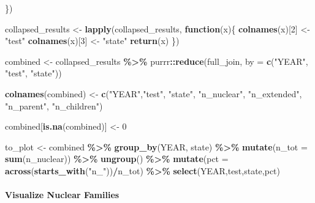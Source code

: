 \documentclass[
]{book}
\newenvironment{Shaded}{\begin{snugshade}}{\end{snugshade}}
\newcommand{\AttributeTok}[1]{\textcolor[rgb]{0.13,0.29,0.53}{#1}}
\newcommand{\ControlFlowTok}[1]{\textcolor[rgb]{0.13,0.29,0.53}{\textbf{#1}}}
\newcommand{\DecValTok}[1]{\textcolor[rgb]{0.00,0.00,0.81}{#1}}
\newcommand{\FunctionTok}[1]{\textcolor[rgb]{0.13,0.29,0.53}{\textbf{#1}}}
\newcommand{\NormalTok}[1]{#1}
\newcommand{\OtherTok}[1]{\textcolor[rgb]{0.56,0.35,0.01}{#1}}
\newcommand{\SpecialCharTok}[1]{\textcolor[rgb]{0.81,0.36,0.00}{\textbf{#1}}}
\newcommand{\StringTok}[1]{\textcolor[rgb]{0.31,0.60,0.02}{#1}}
\begin{document}
\begin{Shaded}
\begin{Highlighting}[]
\NormalTok{\})}


\NormalTok{collapsed\_results }\OtherTok{\textless{}{-}} \FunctionTok{lapply}\NormalTok{(collapsed\_results, }\ControlFlowTok{function}\NormalTok{(x)\{}
  \FunctionTok{colnames}\NormalTok{(x)[}\DecValTok{2}\NormalTok{] }\OtherTok{\textless{}{-}} \StringTok{"test"}
  \FunctionTok{colnames}\NormalTok{(x)[}\DecValTok{3}\NormalTok{] }\OtherTok{\textless{}{-}} \StringTok{"state"}
  \FunctionTok{return}\NormalTok{(x)}
\NormalTok{\})}

\NormalTok{combined }\OtherTok{\textless{}{-}}\NormalTok{ collapsed\_results }\SpecialCharTok{\%\textgreater{}\%}\NormalTok{ purrr}\SpecialCharTok{::}\FunctionTok{reduce}\NormalTok{(full\_join, }\AttributeTok{by =} \FunctionTok{c}\NormalTok{(}\StringTok{"YEAR"}\NormalTok{, }\StringTok{"test"}\NormalTok{, }\StringTok{"state"}\NormalTok{))}



\FunctionTok{colnames}\NormalTok{(combined) }\OtherTok{\textless{}{-}} \FunctionTok{c}\NormalTok{(}\StringTok{"YEAR"}\NormalTok{,}\StringTok{"test"}\NormalTok{, }\StringTok{"state"}\NormalTok{, }\StringTok{"n\_nuclear"}\NormalTok{, }\StringTok{"n\_extended"}\NormalTok{, }\StringTok{"n\_parent"}\NormalTok{, }\StringTok{"n\_children"}\NormalTok{)}

\NormalTok{combined[}\FunctionTok{is.na}\NormalTok{(combined)] }\OtherTok{\textless{}{-}} \DecValTok{0}


\NormalTok{to\_plot }\OtherTok{\textless{}{-}}\NormalTok{ combined }\SpecialCharTok{\%\textgreater{}\%} \FunctionTok{group\_by}\NormalTok{(YEAR, state) }\SpecialCharTok{\%\textgreater{}\%} \FunctionTok{mutate}\NormalTok{(}\AttributeTok{n\_tot =} \FunctionTok{sum}\NormalTok{(n\_nuclear)) }\SpecialCharTok{\%\textgreater{}\%} \FunctionTok{ungroup}\NormalTok{() }\SpecialCharTok{\%\textgreater{}\%} \FunctionTok{mutate}\NormalTok{(}\AttributeTok{pct =}  \FunctionTok{across}\NormalTok{(}\FunctionTok{starts\_with}\NormalTok{(}\StringTok{"n\_"}\NormalTok{))}\SpecialCharTok{/}\NormalTok{n\_tot) }\SpecialCharTok{\%\textgreater{}\%} \FunctionTok{select}\NormalTok{(YEAR,test,state,pct)}
\end{Highlighting}
\end{Shaded}

\hypertarget{visualize-nuclear-families}{%
\paragraph*{Visualize Nuclear Families}\label{visualize-nuclear-families}}
\end{document}
